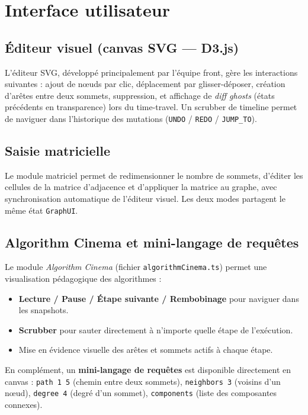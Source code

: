 \documentclass[a4paper,12pt]{report}
\begin{document}
 
\section{Interface utilisateur}
 
\subsection{Éditeur visuel (canvas SVG — D3.js)}
 
L'éditeur SVG, développé principalement par l'équipe front, gère les interactions suivantes :
ajout de nœuds par clic, déplacement par glisser-déposer, création d'arêtes entre deux sommets,
suppression, et affichage de \textit{diff ghosts} (états précédents en transparence) lors du
time-travel. Un scrubber de timeline permet de naviguer dans l'historique des mutations
(\texttt{UNDO} / \texttt{REDO} / \texttt{JUMP\_TO}).
 
\subsection{Saisie matricielle}
 
Le module matriciel permet de redimensionner le nombre de sommets, d'éditer les cellules
de la matrice d'adjacence et d'appliquer la matrice au graphe, avec synchronisation
automatique de l'éditeur visuel. Les deux modes partagent le même état \texttt{GraphUI}.
 
\subsection{Algorithm Cinema et mini-langage de requêtes}

Le module \textit{Algorithm Cinema} (fichier \texttt{algorithmCinema.ts}) permet une visualisation
pédagogique des algorithmes :
\begin{itemize}
    \item \textbf{Lecture / Pause / Étape suivante / Rembobinage} pour naviguer dans les snapshots.
    \item \textbf{Scrubber} pour sauter directement à n'importe quelle étape de l'exécution.
    \item Mise en évidence visuelle des arêtes et sommets actifs à chaque étape.
\end{itemize}

En complément, un \textbf{mini-langage de requêtes} est disponible directement en canvas :
\texttt{path 1 5} (chemin entre deux sommets), \texttt{neighbors 3} (voisins d'un nœud),
\texttt{degree 4} (degré d'un sommet), \texttt{components} (liste des composantes connexes).
\end{document}
